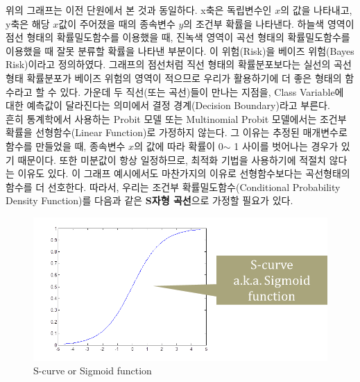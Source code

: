 \documentclass[a4paper]{oblivoir}
\begin{document}
\indent 위의 그래프는 이전 단원에서 본 것과 동일하다. x축은 독립변수인 $x$의 값을 나타내고, y축은 해당 $x$값이 주어졌을 때의 종속변수 $y$의 조건부 확률을 나타낸다. 하늘색 영역이 점선 형태의 확률밀도함수를 이용했을 때, 진녹색 영역이 곡선 형태의 확률밀도함수를 이용했을 때 잘못 분류할 확률을 나타낸 부분이다. 이 위험(Risk)을 베이즈 위험(Bayes Risk)이라고 정의하였다. 그래프의 점선처럼 직선 형태의 확률분포보다는 실선의 곡선 형태 확률분포가 베이즈 위험의 영역이 적으므로 우리가 활용하기에 더 좋은 형태의 함수라고 할 수 있다. 가운데 두 직선(또는 곡선)들이 만나는 지점을, Class Variable에 대한 예측값이 달라진다는 의미에서 결정 경계(Decision Boundary)라고 부른다. \\
\indent 흔히 통계학에서 사용하는 Probit 모델 또는 Multinomial Probit 모델에서는 조건부 확률을 선형함수(Linear Function)로 가정하지 않는다. 그 이유는 추정된 매개변수로 함수를 만들었을 때, 종속변수 $x$의 값에 따라 확률이 0$\sim$ 1 사이를 벗어나는 경우가 있기 때문이다. 또한 미분값이 항상 일정하므로, 최적화 기법을 사용하기에 적절치 않다는 이유도 있다. 이 그래프 예시에서도 마찬가지의 이유로 선형함수보다는 곡선형태의 함수를 더 선호한다. 따라서, 우리는 조건부 확률밀도함수(Conditional Probability Density Function)를 다음과 같은 \textbf{S자형 곡선}으로 가정할 필요가 있다. \\
\begin{figure}[ht]
\centering
\includegraphics[scale=0.6]{Bayes_Risk2.png}
\caption{S-curve or Sigmoid function}
\label{Figure 4-2}
\end{figure}

\end{document}

